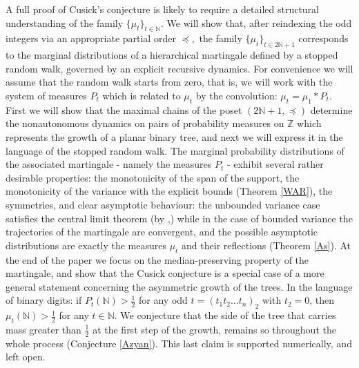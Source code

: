 \documentclass[10pt]{amsart}
\theoremstyle{definition}
\numberwithin{equation}{section}
\newcommand{\N}{\mathbb{N}}
\begin{document}
A full proof of Cusick's conjecture is likely to require a detailed structural understanding of the family $\{\mu_t\}_{t \in \N}$. We will show that, after reindexing the odd integers via an appropriate partial order $\preceq$,\  the family $\{\mu_t\}_{t\in 2\N+1}$ corresponds to the marginal distributions of a hierarchical martingale defined by a stopped random walk, governed by an explicit recursive dynamics. For convenience we will assume that the random walk starts from zero, that is, we will work with the system of measures $P_t$ which is related to $\mu_{t}$ by the  convolution: $\mu_t=\mu_1\ast P_t$. First we will show that the maximal chains of the poset $(2\N+1,\preceq)$ determine the nonautonomous dynamics  on  pairs of probability measures on $\mathbb{Z}$ which represents the growth of a planar binary tree, and next we will express it in the language of the stopped random walk. The marginal probability distributions of the associated martingale - namely the measures $P_t$ - exhibit several rather desirable properties: the monotonicity of the span of the support, the monotonicity of the variance with the explicit bounds (Theorem \ref{WAR}), the symmetries, and clear asymptotic behaviour:  the unbounded variance case satisfies the central limit theorem (by \cite{Hosten},\cite{sw2023}) while in  the case of bounded variance the trajectories of the martingale are convergent, and the possible asymptotic distributions are exactly the measures $\mu_{t}$ and their reflections (Theorem \ref{As}). At the end of the paper we focus on the median-preserving property of the martingale, and show that the Cusick conjecture is a special case of a more general statement concerning the asymmetric growth of the trees.  In the language of binary digits: if $P_t(\N)>\frac12$ for any odd $t=(t_1t_2\dots t_n)_2$ with $t_2=0$, then $\mu_t(\N)>\frac12$ for any $t\in\N$. We conjecture  that the side of the tree that carries mass greater than $\frac12$ at the first step of the growth, remains so  throughout the whole process (Conjecture \ref{Azyan}). This last claim is supported numerically, and left open.



   
\end{document}
